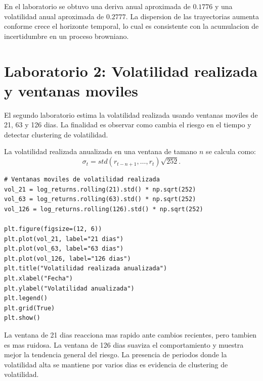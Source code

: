 \documentclass[12pt,a4paper]{article}
\begin{document}
\begin{interpretacion}
En el laboratorio se obtuvo una deriva anual aproximada de \(0.1776\) y una volatilidad anual aproximada de \(0.2777\). La dispersion de las trayectorias aumenta conforme crece el horizonte temporal, lo cual es consistente con la acumulacion de incertidumbre en un proceso browniano.
\end{interpretacion}

\section{Laboratorio 2: Volatilidad realizada y ventanas moviles}

\begin{markdowncell}
El segundo laboratorio estima la volatilidad realizada usando ventanas moviles de 21, 63 y 126 dias. La finalidad es observar como cambia el riesgo en el tiempo y detectar clustering de volatilidad.
\end{markdowncell}

\begin{latexcell}
La volatilidad realizada anualizada en una ventana de tamano \(n\) se calcula como:
\[
\sigma_t = std(r_{t-n+1},\ldots,r_t)\sqrt{252}.
\]
\end{latexcell}

\begin{lstlisting}[style=pythonstyle]
# Ventanas moviles de volatilidad realizada
vol_21 = log_returns.rolling(21).std() * np.sqrt(252)
vol_63 = log_returns.rolling(63).std() * np.sqrt(252)
vol_126 = log_returns.rolling(126).std() * np.sqrt(252)

plt.figure(figsize=(12, 6))
plt.plot(vol_21, label="21 dias")
plt.plot(vol_63, label="63 dias")
plt.plot(vol_126, label="126 dias")
plt.title("Volatilidad realizada anualizada")
plt.xlabel("Fecha")
plt.ylabel("Volatilidad anualizada")
plt.legend()
plt.grid(True)
plt.show()
\end{lstlisting}

\begin{interpretacion}
La ventana de 21 dias reacciona mas rapido ante cambios recientes, pero tambien es mas ruidosa. La ventana de 126 dias suaviza el comportamiento y muestra mejor la tendencia general del riesgo. La presencia de periodos donde la volatilidad alta se mantiene por varios dias es evidencia de clustering de volatilidad.
\end{interpretacion}
\end{document}
